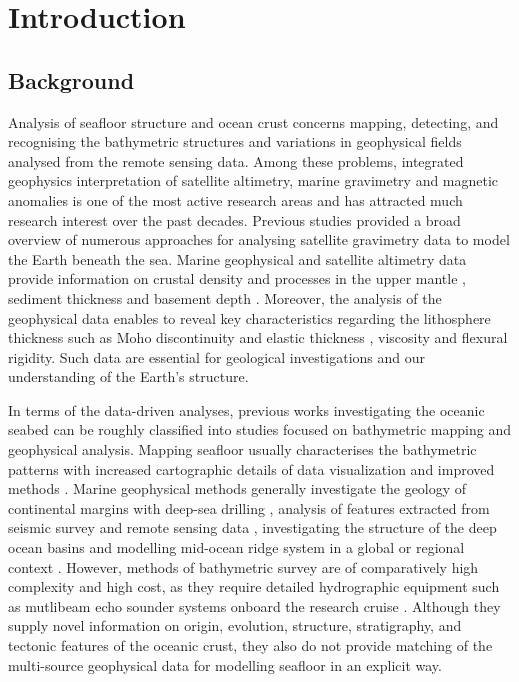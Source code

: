 \documentclass[geomatics,article,submit,pdftex,moreauthors]{Definitions/mdpi}
\begin{document}
\section{Introduction}

\subsection{Background}
Analysis of seafloor structure and ocean crust concerns mapping, detecting, and recognising the bathymetric structures and variations in geophysical fields analysed from the remote sensing data. Among these problems, integrated geophysics interpretation of satellite altimetry,  marine gravimetry and magnetic anomalies is one of the most active research areas and has attracted much research interest over the past decades. Previous studies \cite{ESHAGH2021313} provided a broad overview of numerous approaches for analysing satellite gravimetry data to model the Earth beneath the sea. Marine geophysical and satellite altimetry data provide information on crustal density and processes in the upper mantle \cite{KAPAWAR2021106692,PENG2022110823,ZHANG202368}, sediment thickness and basement depth \cite{Lemenkova202005}. Moreover, the analysis of the geophysical data enables to reveal key characteristics regarding the lithosphere thickness such as Moho discontinuity and elastic thickness \cite{TESAURO201378}, viscosity and flexural rigidity. Such data are essential for geological investigations and our understanding of the Earth's structure.

In terms of the data-driven analyses, previous works investigating the oceanic seabed can be roughly classified into studies focused on bathymetric mapping and geophysical analysis. Mapping seafloor usually characterises the bathymetric patterns with increased cartographic details of data visualization and improved methods \cite{Battista,Lemenkova202105,Lemenkova202012}. Marine geophysical methods generally investigate the geology of continental margins with deep-sea drilling \cite{Schlich1992TheGA,Veevers1991a}, analysis of features extracted from seismic survey and remote sensing data \cite{NEGI2022229330}, investigating the structure of the deep ocean basins \cite{BENARD2010633,RAMANA2001241,DAVIS201616} and modelling mid-ocean ridge system in a global or regional context \cite{FREY200073,Sreejith,Lemenkova202112}. However, methods of bathymetric survey are of comparatively high complexity and high cost, as they require detailed hydrographic equipment such as mutlibeam echo sounder systems onboard the research cruise \cite{Falvey}. Although they supply novel information on origin, evolution, structure, stratigraphy, and tectonic features of the oceanic crust, they also do not provide matching of the multi-source geophysical data for modelling seafloor in an explicit way. 
\end{document}
